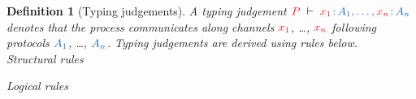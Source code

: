 \documentclass[copyright,creativecommons]{eptcs}
\newtheorem{definition}[lemma]{Definition}
\begin{document}
\begin{definition}[Typing judgements]\label{def:cp}
  A typing judgement $\seq[{ P }]{\tmty{x_1}{A_1}, \dots, \tmty{x_n}{A_n}}$
  denotes that the process  communicates along channels $\tm{x_1}$, \dots,
  $\tm{x_n}$ following protocols $\ty{A_1}$, \dots, $\ty{A_n}$. Typing
  judgements are derived using rules below.
  \\[1\baselineskip]
  {Structural rules}
  \begin{center}
    \cpInfAx \cpInfCut
  \end{center}
	{Logical rules}
  \begin{center}
    \cpInfTens \cpInfParr
  \end{center}
  \begin{center}
    \cpInfBot
    \cpInfOne
  \end{center}
  \begin{center}
  \end{center}
  \begin{center}
    \cpInfWith
  \end{center}
  \begin{center}
    \cpInfNil
    \cpInfTop   
  \end{center}
\end{definition}
\end{document}
